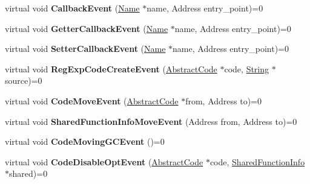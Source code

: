 \begin{DoxyCompactItemize}
\item 
virtual void {\bfseries Callback\+Event} (\hyperlink{classv8_1_1internal_1_1_name}{Name} $\ast$name, Address entry\+\_\+point)=0\hypertarget{classv8_1_1internal_1_1_code_event_listener_a6196afb9679f746e0b87ca6f818daf87}{}\label{classv8_1_1internal_1_1_code_event_listener_a6196afb9679f746e0b87ca6f818daf87}

\item 
virtual void {\bfseries Getter\+Callback\+Event} (\hyperlink{classv8_1_1internal_1_1_name}{Name} $\ast$name, Address entry\+\_\+point)=0\hypertarget{classv8_1_1internal_1_1_code_event_listener_a75ddb9c2237e17f9cced780be7934d26}{}\label{classv8_1_1internal_1_1_code_event_listener_a75ddb9c2237e17f9cced780be7934d26}

\item 
virtual void {\bfseries Setter\+Callback\+Event} (\hyperlink{classv8_1_1internal_1_1_name}{Name} $\ast$name, Address entry\+\_\+point)=0\hypertarget{classv8_1_1internal_1_1_code_event_listener_a84eb541598ca417e605faf8da02aa93b}{}\label{classv8_1_1internal_1_1_code_event_listener_a84eb541598ca417e605faf8da02aa93b}

\item 
virtual void {\bfseries Reg\+Exp\+Code\+Create\+Event} (\hyperlink{classv8_1_1internal_1_1_abstract_code}{Abstract\+Code} $\ast$code, \hyperlink{classv8_1_1internal_1_1_string}{String} $\ast$source)=0\hypertarget{classv8_1_1internal_1_1_code_event_listener_a5210c90cc0d08b70b31e01db3d62d325}{}\label{classv8_1_1internal_1_1_code_event_listener_a5210c90cc0d08b70b31e01db3d62d325}

\item 
virtual void {\bfseries Code\+Move\+Event} (\hyperlink{classv8_1_1internal_1_1_abstract_code}{Abstract\+Code} $\ast$from, Address to)=0\hypertarget{classv8_1_1internal_1_1_code_event_listener_a91b7e98f4ab12abbd2e2ba65395da7a3}{}\label{classv8_1_1internal_1_1_code_event_listener_a91b7e98f4ab12abbd2e2ba65395da7a3}

\item 
virtual void {\bfseries Shared\+Function\+Info\+Move\+Event} (Address from, Address to)=0\hypertarget{classv8_1_1internal_1_1_code_event_listener_a77afc22a53334cc9c5c789483bae6529}{}\label{classv8_1_1internal_1_1_code_event_listener_a77afc22a53334cc9c5c789483bae6529}

\item 
virtual void {\bfseries Code\+Moving\+G\+C\+Event} ()=0\hypertarget{classv8_1_1internal_1_1_code_event_listener_a26220ae93a543e9ead1267ee1d91882b}{}\label{classv8_1_1internal_1_1_code_event_listener_a26220ae93a543e9ead1267ee1d91882b}

\item 
virtual void {\bfseries Code\+Disable\+Opt\+Event} (\hyperlink{classv8_1_1internal_1_1_abstract_code}{Abstract\+Code} $\ast$code, \hyperlink{classv8_1_1internal_1_1_shared_function_info}{Shared\+Function\+Info} $\ast$shared)=0\hypertarget{classv8_1_1internal_1_1_code_event_listener_a404c5f54835ba163f72be24c6e303a14}{}\label{classv8_1_1internal_1_1_code_event_listener_a404c5f54835ba163f72be24c6e303a14}

\end{DoxyCompactItemize}



